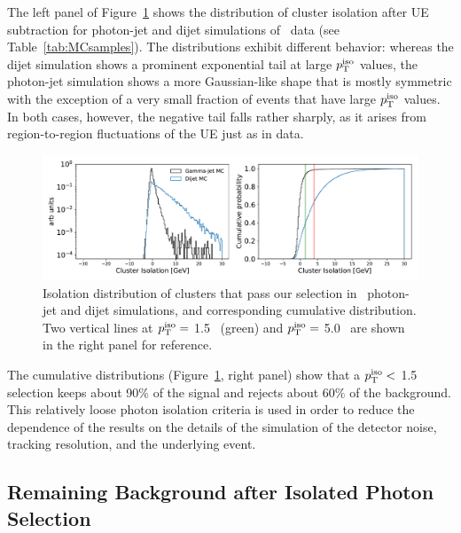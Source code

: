 The left panel of Figure~\ref{MC_Isolation} shows the distribution of cluster isolation after UE subtraction for photon-jet and dijet simulations of \pPb~data (see Table~\ref{tab:MCsamples}). The distributions exhibit different behavior: whereas the dijet simulation shows a prominent exponential tail at large $p_{\mathrm{T}}^\mathrm{iso}$ values, the photon-jet simulation shows a more Gaussian-like shape that is mostly symmetric with the exception of a very small fraction of events that have large $p_{\mathrm{T}}^\mathrm{iso}$ values. In both cases, however, the negative tail falls rather sharply, as it arises from region-to-region fluctuations of the UE just as in data.

\begin{figure}[hbtp]
\center
\includegraphics[width=1.0\textwidth]{Data_Analysis/Isolation/IsolationMCsignal_Skimmed_17g6a1_pthat1_4L_root}
\caption{Isolation distribution of clusters that pass our selection in \pPb~photon-jet and dijet simulations, and corresponding cumulative distribution. Two vertical lines at $p_{\mathrm{T}}^\mathrm{iso}=$ 1.5 \GeVc~(green) and $p_{\mathrm{T}}^\mathrm{iso}=$ 5.0 \GeVc~are shown in the right panel for reference.}
\label{MC_Isolation}
\end{figure}


The cumulative distributions (Figure~\ref{MC_Isolation}, right panel) show that a {$p_{\mathrm{T}}^\mathrm{iso}<$ 1.5 \GeVc} selection keeps about 90$\%$ of the signal and rejects about 60$\%$ of the background. This relatively loose photon isolation criteria is used in order to reduce the dependence of the results on the details of the simulation of the detector noise, tracking resolution, and the underlying event. 


\subsection{Remaining Background after Isolated Photon Selection}

